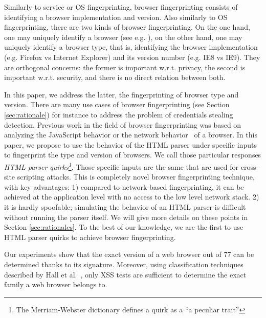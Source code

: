 \documentclass[10pt]{IEEEtran}
\begin{document}
Similarly to service or OS fingerprinting, browser fingerprinting consists 
of identifying a browser implementation and version.
Also similarly to OS fingerprinting, there are two kinds of browser fingerprinting.
On the one hand, one may uniquely identify a browser (see e.g. \cite{eckersley2010unique}), 
on the other hand, one may uniquely identify a browser type, that is, identifying the browser implementation (e.g. Firefox vs Internet Explorer) and its version number (e.g. IE8 vs IE9).
They are orthogonal concerns: the former is important w.r.t. privacy, the second is important w.r.t. security, and there is no direct relation between both.




In this paper, we address the latter, the fingerprinting of browser type and version.
There are many use cases of browser fingerprinting (see Section \ref{sec:rationale}) for instance to address the problem of credentials stealing detection.
Previous work in the field of browser fingerprinting was based on analyzing the 
JavaScript behavior \cite{mowery2011fingerprinting} or  the network behavior~\cite{yen2009browser} of a browser.
In this paper, we propose to use the behavior of the HTML parser under specific inputs to 
fingerprint the type and version of browsers. 
We call those particular responses \emph{HTML parser quirks\footnote{The Merriam-Webster
dictionary defines a quirk as a ``a peculiar trait''}}.
Those specific inputs are the same that are used for cross-site scripting 
attacks.
This is completely novel browser fingerprinting technique, with key advantages:
1) compared to network-based fingerprinting, it can be achieved at the application level with 
no access to the low level network stack.
2) it is hardly spoofable; simulating the behavior of an HTML parser is difficult without running the parser itself.
We will give more details on these points in Section \ref{sec:rationales}.
To the best of our knowledge, we are the first to use HTML parser quirks to achieve browser fingerprinting.




Our experiments show that the exact version
of a web browser out of 77 can be determined thanks to its signature. 
Moreover, using classification techniques described by Hall et al.~\cite{hall2009weka},  only  XSS tests are 
sufficient to determine the exact family a web browser belongs to. 
\end{document}
